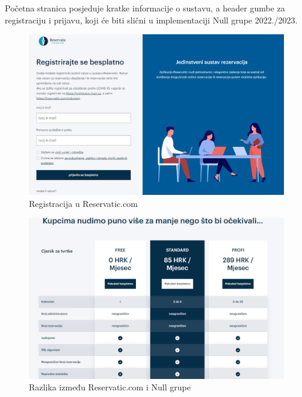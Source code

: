              
             \texttt{}{Početna stranica posjeduje kratke informacije o sustavu, a header gumbe za registraciju i prijavu, koji će biti slični u implementaciji Null grupe 2022./2023.}
             \newline
              \begin{figure}[H]
			             \includegraphics[width=\textwidth]{slike/slicne2.jpg}
			            \caption{Registracija u Reservatic.com}
			            \label{fig:promjene2} %
		            \end{figure}
            \begin{figure}[H]
			             \includegraphics[width=\textwidth]{slike/slicne3.jpg}
			            \caption{Razlika između Reservatic.com i Null grupe}
			            \label{fig:promjene2} %
		            \end{figure}

             



